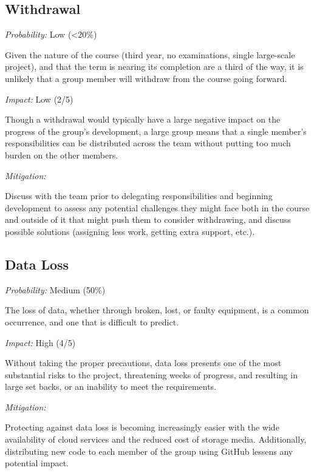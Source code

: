 \documentclass[11pt]{article}
\begin{document}
\subsection{Withdrawal}
\textit{Probability:} Low (\textless20\%) \begin{addmargin}[1em]{2em} Given the nature of the course
(third year, no examinations, single large-scale project), and that the term is nearing its
completion are a third of the way, it is unlikely that a group member will withdraw from the course
going forward.\end{addmargin}\vspace{2mm}
\noindent \textit{Impact:} Low (2/5) \begin{addmargin}[1em]{2em}Though a withdrawal would
typically have a large negative impact on the progress of the group’s development, a large group
means that a single member’s responsibilities can be distributed across the team without putting too
much burden on the other members.\end{addmargin}\vspace{2mm}
\noindent \textit{Mitigation:} \begin{addmargin}[1em]{2em} Discuss with the team prior to delegating
responsibilities and beginning development to assess any potential challenges they might face both
in the course and outside of it that might push them to consider withdrawing, and
discuss possible solutions (assigning less work, getting extra support, etc.).\end{addmargin}

\subsection{Data Loss}
\textit{Probability:} Medium (50\%) \begin{addmargin}[1em]{2em} The loss of data, whether through
broken, lost, or faulty equipment, is a common occurrence, and one that is difficult to predict.
\end{addmargin}\vspace{2mm}
\noindent \textit{Impact:} High (4/5) \begin{addmargin}[1em]{2em} Without taking the proper
precautions, data loss presents one of the most substantial risks to the project, threatening
weeks of progress, and resulting in large set backs, or an inability to meet the requirements.
\end{addmargin}\vspace{2mm}
\noindent \textit{Mitigation:} \begin{addmargin}[1em]{2em} Protecting against data loss is becoming
increasingly easier with the wide availability of cloud services and the reduced cost of storage
media. Additionally, distributing new code to each member of the group using GitHub lessens any
potential impact.\end{addmargin}
\end{document}
